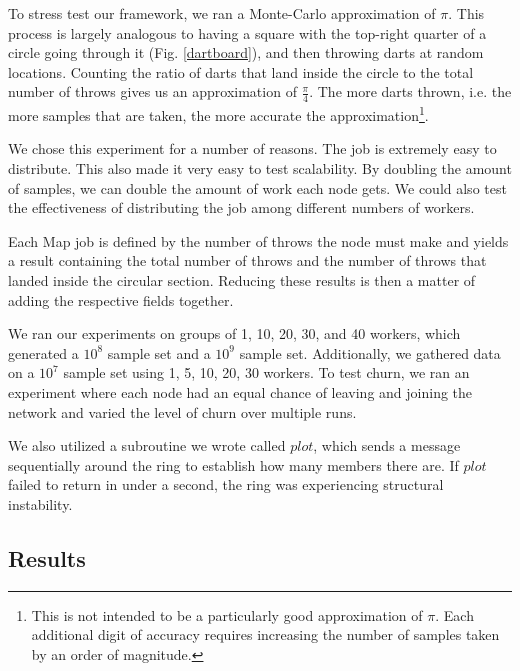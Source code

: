 \documentclass[10pt, conference, compsocconf]{IEEEtran}
\begin{document}
To stress test our framework, we ran a Monte-Carlo approximation of $\pi$. This process is largely analogous to having a square with the top-right quarter of a circle going through it (Fig. \ref{dartboard}), and then throwing darts at random locations.  Counting the ratio of darts that land inside the circle to the total number of throws gives us an approximation of $\frac{\pi}{4}$.  The more darts thrown, i.e. the more samples that are taken, the more accurate the approximation\footnote{This is not intended to be a particularly good approximation of $\pi$. Each additional digit of accuracy requires increasing the number of samples taken by an order of magnitude.}.

We chose this experiment for a number of reasons. The job is extremely easy to distribute.  This also made it very easy to test scalability. By doubling the amount of samples, we can double the amount of work each node gets.  We could also test the effectiveness of distributing the job among different numbers of workers.

Each Map job is defined by the number of throws the node must make and yields a result containing the total number of throws and the number of throws that landed inside the circular section.  Reducing these results is then a matter of adding the respective fields together. 



We ran our experiments on groups of 1, 10, 20, 30, and 40 workers, which generated a $10^{8}$ sample set and a $10^{9}$ sample set.  Additionally, we gathered data on a $10^{7}$ sample set using 1, 5, 10, 20, 30 workers.  To test churn, we ran an experiment where each node had an equal chance of leaving and joining the network and varied the level of churn over multiple runs.  

We also utilized a subroutine we wrote called $plot$, which sends a message sequentially around the ring to establish how many members there are.  If $plot$ failed to return in under a second, the ring was experiencing structural instability.

\subsection{Results}
\end{document}
